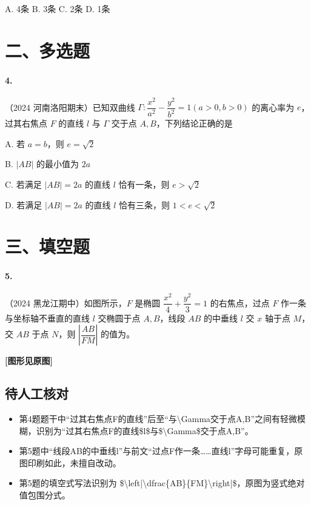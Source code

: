 \documentclass[UTF8,a4paper,11pt]{ctexart}
\begin{document}
A. 4条 \qquad B. 3条 \qquad C. 2条 \qquad D. 1条

\section*{二、多选题}

\paragraph{4.}（2024 河南洛阳期末）已知双曲线 $\Gamma: \dfrac{x^2}{a^2}-\dfrac{y^2}{b^2}=1(a>0,b>0)$ 的离心率为 $e$，过其右焦点 $F$ 的直线 $l$ 与 $\Gamma$ 交于点 $A,B$，下列结论正确的是

A. 若 $a=b$，则 $e=\sqrt{2}$

B. $|AB|$ 的最小值为 $2a$

C. 若满足 $|AB|=2a$ 的直线 $l$ 恰有一条，则 $e>\sqrt{2}$

D. 若满足 $|AB|=2a$ 的直线 $l$ 恰有三条，则 $1<e<\sqrt{2}$

\section*{三、填空题}

\paragraph{5.}（2024 黑龙江期中）如图所示，$F$ 是椭圆 $\dfrac{x^2}{4}+\dfrac{y^2}{3}=1$ 的右焦点，过点 $F$ 作一条与坐标轴不垂直的直线 $l$ 交椭圆于点 $A,B$，线段 $AB$ 的中垂线 $l$ 交 $x$ 轴于点 $M$，交 $AB$ 于点 $N$，则 $\left|\dfrac{AB}{FM}\right|$ 的值为\underline{\qquad}。

\begin{center}
\textbf{[图形见原图]}
\end{center}

\subsection*{待人工核对}

\begin{itemize}

\item 第4题题干中“过其右焦点F的直线”后至“与\textbackslash{}Gamma交于点A,B”之间有轻微模糊，识别为“过其右焦点F的直线\$l\$与\$\textbackslash{}Gamma\$交于点A,B”。

\item 第5题中“线段AB的中垂线l”与前文“过点F作一条……直线l”字母可能重复，原图印刷如此，未擅自改动。

\item 第5题的填空式写法识别为 \$\textbackslash{}left|\textbackslash{}dfrac\{AB\}\{FM\}\textbackslash{}right|\$，原图为竖式绝对值包围分式。

\end{itemize}
\end{document}
